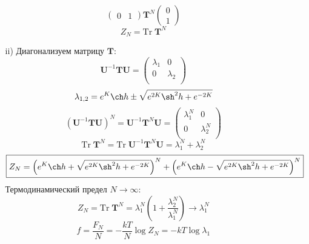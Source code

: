 \documentclass[12pt]{article}
\theoremstyle{definition}
\begin{document}
\begin{enumerate}
\begin{itemize}
\begin{equation}
\begin{pmatrix}
            0 & 1
            \end{pmatrix}\textbf{T}^N\begin{pmatrix}
            0\\1
            \end{pmatrix}
        \end{equation}
        \begin{equation}
            \boxed{Z_N=\text{Tr}\;\textbf{T}^N}
        \end{equation}
    \item[ii)] Диагонализуем матрицу $\textbf{T}$:
    \begin{equation}
        \textbf{U}^{-1}\textbf{T}\textbf{U}=\begin{pmatrix}
            \lambda_1 & 0\\
            0 & \lambda_2\\
        \end{pmatrix}
    \end{equation}
    \begin{equation}
        \lambda_{1,2}=e^K\ch h\pm\sqrt{e^{2K}\sh^2h+e^{-2K}}
    \end{equation}
    \begin{equation}
        (\textbf{U}^{-1}\textbf{T}\textbf{U})^N=\textbf{U}^{-1}\textbf{T}^N\textbf{U}=\begin{pmatrix}
            \lambda^N_1 & 0\\
            0 & \lambda^N_2\\
        \end{pmatrix}
    \end{equation}
    \begin{equation}
        \text{Tr}\;\textbf{T}^N=\text{Tr}\;\textbf{U}^{-1}\textbf{T}^N\textbf{U}=\lambda^N_1+\lambda^N_2
    \end{equation}
    \begin{equation}
        \boxed{Z_N=\left(e^K\ch h+\sqrt{e^{2K}\sh^2h+e^{-2K}}\right)^N+\left(e^K\ch h-\sqrt{e^{2K}\sh^2h+e^{-2K}}\right)^N}
    \end{equation}
    Термодинамический предел $N\rightarrow\infty$:
    \begin{equation}
        Z_N=\text{Tr}\;\textbf{T}^N=\lambda^N_1\left(1+\frac{\lambda^N_2}{\lambda^N_1}\right)\rightarrow\lambda_1^N
    \end{equation}
    \begin{equation}
        f=\frac{F_N}{N}=-\frac{kT}{N}\log Z_N=-kT\log\lambda_1
    \end{equation}

\end{itemize}
\end{enumerate}
\end{document}
